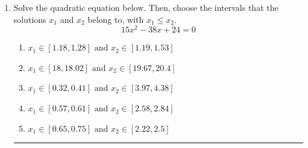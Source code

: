 \documentclass[14pt]{extbook}
\newcommand{\litem}[1]{\item#1\hspace*{-1cm}\rule{\textwidth}{0.4pt}}
\begin{document}
\begin{enumerate}
{\begin{enumerate}[label=\Alph*.]
\end{enumerate} }
\litem{
Solve the quadratic equation below. Then, choose the intervals that the solutions $x_1$ and $x_2$ belong to, with $x_1 \leq x_2$.\[ 15x^{2} -38 x + 24 = 0 \]\begin{enumerate}[label=\Alph*.]
\item \( x_1 \in [1.18, 1.28] \text{ and } x_2 \in [1.19, 1.53] \)
\item \( x_1 \in [18, 18.02] \text{ and } x_2 \in [19.67, 20.4] \)
\item \( x_1 \in [0.32, 0.41] \text{ and } x_2 \in [3.97, 4.38] \)
\item \( x_1 \in [0.57, 0.61] \text{ and } x_2 \in [2.58, 2.84] \)
\item \( x_1 \in [0.65, 0.75] \text{ and } x_2 \in [2.22, 2.5] \)


\end{enumerate}}
\end{enumerate}
\end{document}
